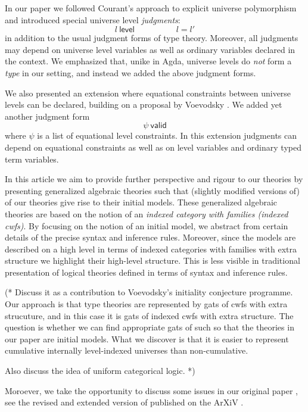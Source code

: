 \documentclass[11pt,a4paper]{article}
\theoremstyle{definition}
\newcommand{\valid}{\mathsf{valid}}
\newcommand{\level}{\mathsf{level}}
\begin{document}
In our paper we followed Courant's approach \cite{Courant02} to explicit universe polymorphism and introduced special universe level {\em judgments}:
$$
l\ \level
\hspace{5em}
l = l'
$$
in addition to the usual judgment forms of type theory. Moreover, all judgments may depend on universe level variables as well as ordinary variables declared in the context. We emphasized that, unike in Agda, universe levels do {\em not} form a {\em type} in our setting, and instead we added the above judgment forms. 

We also presented an extension where equational constraints between universe levels can be declared, building on a proposal by Voevodsky \cite{VV}. We added yet another judgment form
$$
\psi\ \valid
$$
where $\psi$ is a list of equational level constraints. 
In this extension judgments can depend on equational constraints as well as on level variables and ordinary typed term variables.

In this article we aim to provide further perspective and rigour to our theories by presenting generalized algebraic theories such that (slightly modified versions of) of our theories give rise to their initial models. These generalized algebraic theories are based on the notion of an {\em indexed category with families (indexed cwfs)}.
By focusing on the notion of an initial model, we abstract from certain details of the precise syntax and inference rules.  Moreover, since the models are described on a high level in terms of indexed categories with families with extra structure we highlight their high-level structure. This is less visible in traditional presentation of logical theories defined in terms of syntax and inference rules. 

(* Discuss it as a contribution to Voevodsky's initiality conjecture programme. Our approach is that type theories are represented by gats of cwfs with extra strucuture, and in this case it is gats of indexed cwfs with extra structure. The question is whether we can find appropriate gats of such so that the theories in our paper are initial models. What we discover is that it is easier to represent cumulative internally level-indexed universes than non-cumulative.

Also discuss the idea of uniform categorical logic. *) 
 
Moroever, we take the opportunity to discuss some issues in our original paper \cite{BezemCDE22}, see the revised and extended version of published on the ArXiV \cite{BezemCDE22:revised}.
\end{document}
